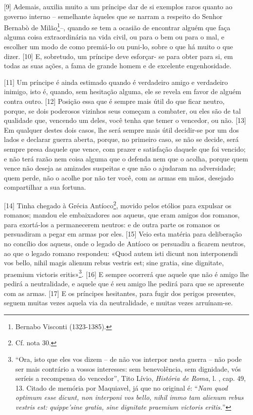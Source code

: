 {[}9{]} Ademais, auxilia muito a um príncipe dar de si exemplos raros
quanto ao governo interno -- semelhante àqueles que se narram a respeito
do Senhor Bernabò de Milão\footnote{Bernabo Visconti (1323-1385).}--,
quando se tem a ocasião de encontrar alguém que faça alguma coisa
extraordinária na vida civil, ou para o bem ou para o mal, e escolher um
modo de como premiá-lo ou puni-lo, sobre o que há muito o que dizer.
{[}10{]} E, sobretudo, um príncipe deve esforçar- se para obter para si,
em todas as suas ações, a fama de grande homem e de excelente
engenhosidade.

{[}11{]} Um príncipe é ainda estimado quando é verdadeiro amigo e
verdadeiro inimigo, isto é, quando, sem hesitação alguma, ele se revela
em favor de alguém contra outro. {[}12{]} Posição essa que é sempre mais
útil do que ficar neutro, porque, se dois poderosos vizinhos seus
começam a combater, ou eles são de tal qualidade que, vencendo um deles,
você tenha que temer o vencedor, ou não. {[}13{]} Em qualquer destes
dois casos, lhe será sempre mais útil decidir-se por um dos lados e
declarar guerra aberta, porque, no primeiro caso, se não se decide, será
sempre presa daquele que vence, com prazer e satisfação daquele que foi
vencido; e não terá razão nem coisa alguma que o defenda nem que o
acolha, porque quem vence não deseja as amizades suspeitas e que não o
ajudaram na adversidade; quem perde, não o acolhe por não ter você, com
as armas em mãos, desejado compartilhar a sua fortuna.

{[}14{]} Tinha chegado à Grécia Antíoco\footnote{Cf. nota 30.}, movido
pelos etólios para expulsar os romanos; mandou ele embaixadores aos
aqueus, que eram amigos dos romanos, para exortá-los a permanecerem
neutros: e de outra parte os romanos os persuadiram a pegar em armas por
eles. {[}15{]} Veio esta matéria para deliberação no concílio dos
aqueus, onde o legado de Antíoco os persuadiu a ficarem neutros, ao que
o legado romano respondeu: «Quod autem isti dicunt non interponendi vos
bello, nihil magis alienum rebus vestris est; sine gratia, sine
dignitate, praemium victoris eritis»\footnote{``Ora, isto que eles vos
  dizem -- de não vos interpor nesta guerra -- não pode ser mais
  contrário a vossos interesses: sem benevolência, sem dignidade, vós
  seríeis a recompensa do vencedor'', Tito Lívio, \emph{História de
  Roma}, l. , cap. 49, 13. Citado de memória por Maquiavel, já que
  no original é: ``\emph{Nam quod optimum esse dicunt, non interponi vos
  bello, nihil immo tam alienum rebus vestris est: quippe'sine gratia,
  sine dignitate praemium victoris eritis.}''}. {[}16{]} E sempre
ocorrerá que aquele que não é amigo lhe pedirá a neutralidade, e aquele
que é seu amigo lhe pedirá para que se apresente com as armas. {[}17{]}
E os príncipes hesitantes, para fugir dos perigos presentes, seguem
muitas vezes aquela via da neutralidade, e muitas vezes arruínam-se.

